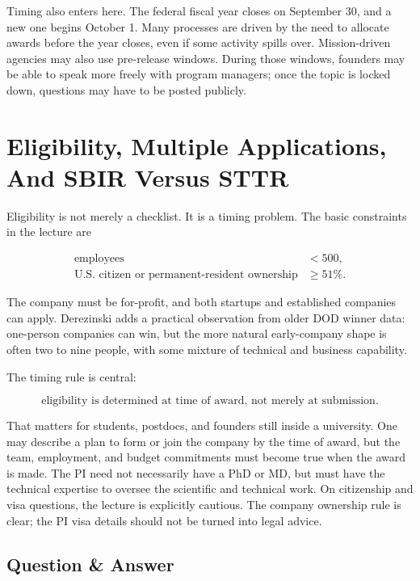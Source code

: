 Timing also enters here. The federal fiscal year closes on September 30, and a new one begins October 1. Many processes are driven by the need to allocate awards before the year closes, even if some activity spills over. Mission-driven agencies may also use pre-release windows. During those windows, founders may be able to speak more freely with program managers; once the topic is locked down, questions may have to be posted publicly.

\section{Eligibility, Multiple Applications, And SBIR Versus STTR}

Eligibility is not merely a checklist. It is a timing problem. The basic constraints in the lecture are

\begin{align}
\text{employees} &< 500,\\
\text{U.S. citizen or permanent-resident ownership} &\ge 51\%.
\end{align}

The company must be for-profit, and both startups and established companies can apply. Derezinski adds a practical observation from older DOD winner data: one-person companies can win, but the more natural early-company shape is often two to nine people, with some mixture of technical and business capability.

The timing rule is central:

\begin{equation}
\text{eligibility is determined at time of award, not merely at submission.}
\end{equation}

That matters for students, postdocs, and founders still inside a university. One may describe a plan to form or join the company by the time of award, but the team, employment, and budget commitments must become true when the award is made. The PI need not necessarily have a PhD or MD, but must have the technical expertise to oversee the scientific and technical work. On citizenship and visa questions, the lecture is explicitly cautious. The company ownership rule is clear; the PI visa details should not be turned into legal advice.

\subsection{Question \& Answer}

